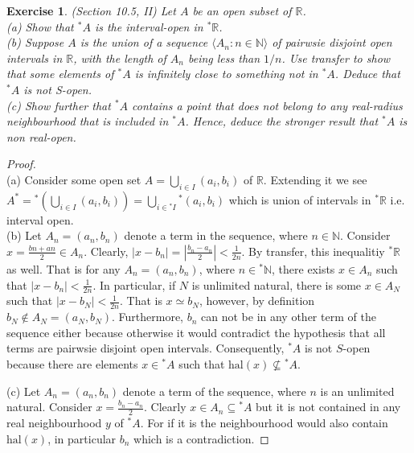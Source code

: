 \documentclass[a4paper, 11pt, openany]{book}
\theoremstyle{plain}
\newtheorem{exercise}{Exercise}[chapter]
\theoremstyle{plain}
\newcommand{\N}{\mathbb{N}}
\newcommand{\R}{\mathbb{R}}
\newcommand{\la}{\langle}
\newcommand{\ra}{\rangle}
\newcommand{\hyp}{{}^*}
\newcommand{\hal}{\text{hal}}
\begin{document}
    \begin{exercise}
      (Section 10.5, II)
      Let $A$ be an open subset of $\R$. \\
      (a) Show that $\hyp A$ is the interval-open in $\hyp \R$. \\
      (b) Suppose $A$ is the union of a sequence $\la A_n: n \in \N \ra$ of pairwsie disjoint open intervals in $\R$, with the length of $A_n$ being less than $1/n$. Use transfer to show that some elements of $\hyp A$ is infinitely close to something not in $\hyp A$. Deduce that $\hyp A$ is not S-open. \\
      (c) Show further that $\hyp A$ contains a point that does not belong to any real-radius neighbourhood that is included in $\hyp A$. Hence, deduce the stronger result that $\hyp A$ is non real-open.
    \end{exercise}
    \begin{proof} $ $ \\

      (a) Consider some open set $A=\bigcup_{i \in I} (a_i,b_i)$ of $\R$. Extending it we see $A^*=\hyp \left( \bigcup_{i \in I} (a_i, b_i) \right)=\bigcup_{i \in  \hyp I} \hyp (a_i, b_i)$ which is union of intervals in $\hyp \R$ i.e. interval open. \\

      (b) Let $A_n=(a_n, b_n)$ denote a term in the sequence, where $n \in \mathbb{N}$. Consider $x=\frac{bn+an}{2} \in A_n$. Clearly, $|x-b_n|=\left|\frac{b_n-a_n}{2} \right|<\frac{1}{2n}$. By transfer, this inequalitiy $\hyp \R$ as well. That is for any $A_n=(a_n, b_n)$, where $n \in \hyp \N$, there exists $x \in A_n$ such that $|x-b_n|<\frac{1}{2n}$. In particular, if $N$ is unlimited natural, there is some $x \in A_N$ such that $|x-b_N|<\frac{1}{2n}$. That is $x \simeq b_N$, however, by definition $b_N \notin A_N=(a_N, b_N)$. Furthermore, $b_n$ can not be in any other term of the sequence either because otherwise it would contradict the hypothesis that all terms are pairwsie disjoint open intervals. Consequently, $\hyp A$ is not $S$-open because there are elements $x \in \hyp A$ such that $\hal(x) \not \subseteq \hyp A$.

      (c) Let $A_n=(a_n, b_n)$ denote a term of the sequence, where $n$ is an unlimited natural. Consider $x=\frac{b_n-a_n}{2}$. Clearly $x \in A_n \subseteq \hyp A$ but it is not contained in any real neighbourhood $y$ of $\hyp A$. For if it is the neighbourhood would also contain $\hal(x)$, in particular $b_n$ which is a contradiction.
    \end{proof}
\end{document}
